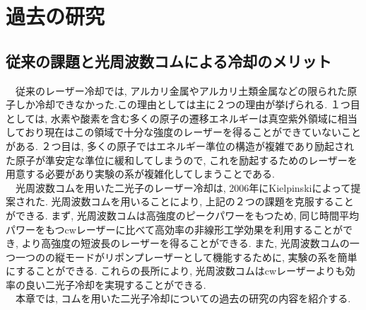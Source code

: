 \documentclass[uplatex, dvipdfmx, a4paper, report, papersize, 11pt]{jsbook}
\begin{document}
\chapter{過去の研究}
\section{従来の課題と光周波数コムによる冷却のメリット}

　従来のレーザー冷却では, アルカリ金属やアルカリ土類金属などの限られた原子しか冷却できなかった.この理由としては主に２つの理由が挙げられる. １つ目としては, 水素や酸素を含む多くの原子の遷移エネルギーは真空紫外領域に相当しており現在はこの領域で十分な強度のレーザーを得ることができていないことがある. ２つ目は, 多くの原子ではエネルギー準位の構造が複雑であり励起された原子が準安定な準位に緩和してしまうので, これを励起するためのレーザーを用意する必要があり実験の系が複雑化してしまうことである\cite{PhysRevA.73.063407}.\\
　光周波数コムを用いた二光子のレーザー冷却は, 2006年にKielpinski\cite{PhysRevA.73.063407}によって提案された. 光周波数コムを用いることにより, 上記の２つの課題を克服することができる. まず, 光周波数コムは高強度のピークパワーをもつため, 同じ時間平均パワーをもつcwレーザーに比べて高効率の非線形工学効果を利用することができ, より高強度の短波長のレーザーを得ることができる. また, 光周波数コムの一つ一つのの縦モードがリポンプレーザーとして機能するために, 実験の系を簡単にすることができる. これらの長所により, 光周波数コムはcwレーザーよりも効率の良い二光子冷却を実現することができる\cite{PhysRevA.73.063407}.\\
　本章では, コムを用いた二光子冷却についての過去の研究の内容を紹介する.
\end{document}
